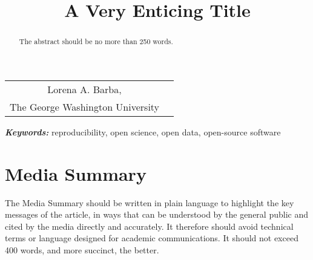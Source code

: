 \documentclass[]{hdsr}
\begin{document}




\begin{center}

  \title{A Very Enticing Title}
  \maketitle

  \thispagestyle{empty}
  
  \vspace*{.2in}

  \begin{tabular}{cc}
    Lorena A. Barba\upstairs{\affilone,*},
   \\[0.25ex]
   {\small \upstairs{\affilone} The George Washington University} \\
  \end{tabular}
  
  \vspace*{0.4in}

\begin{abstract}
The abstract should be no more than 250 words.
\end{abstract}
\end{center}

\vspace*{0.15in}
\hspace{10pt}
  \small	
  \textbf{\textit{Keywords: }} {reproducibility, open science, open data, open-source software}
  
\copyrightnotice

\section*{Media Summary}
The Media Summary should be written in plain language to highlight the key messages of
the article, in ways that can be understood by the general public and cited by the media 
directly and accurately.  It therefore should avoid technical terms or language designed for
academic communications. It should not exceed 400 words, and more succinct, the better.
\end{document}
